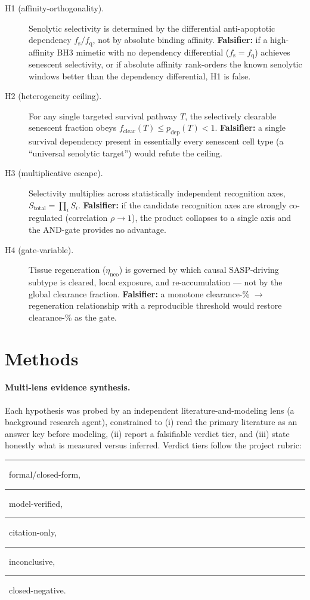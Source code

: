 \documentclass[11pt,a4paper]{article}
\newcommand{\tierdisc}[1]{\textcolor{#1}{\rule[0.05ex]{1.0ex}{1.0ex}}}
\newcommand{\tierBlue}{\tierdisc{blue!70!black}}
\newcommand{\tierGreen}{\tierdisc{green!60!black}}
\newcommand{\tierYellow}{\tierdisc{yellow!85!black}}
\newcommand{\tierOrange}{\tierdisc{orange!90!black}}
\newcommand{\tierRed}{\tierdisc{red!80!black}}
\newcommand{\fs}{f_{\mathrm{s}}}
\newcommand{\fq}{f_{\mathrm{q}}}
\newcommand{\Stot}{S_{\mathrm{total}}}
\newcommand{\fclear}{f_{\mathrm{clear}}}
\newcommand{\pdep}{p_{\mathrm{dep}}}
\begin{document}
\begin{description}
\item[H1 (affinity-orthogonality).] Senolytic selectivity is determined by the
  differential anti-apoptotic dependency $\fs/\fq$, not by absolute binding
  affinity. \textbf{Falsifier:} if a high-affinity BH3 mimetic with no
  dependency differential ($\fs=\fq$) achieves senescent selectivity, or if
  absolute affinity rank-orders the known senolytic windows better than the
  dependency differential, H1 is false.
\item[H2 (heterogeneity ceiling).] For any single targeted survival pathway
  $T$, the selectively clearable senescent fraction obeys
  $\fclear(T)\le\pdep(T)<1$. \textbf{Falsifier:} a single survival dependency
  present in essentially every senescent cell type (a ``universal senolytic
  target'') would refute the ceiling.
\item[H3 (multiplicative escape).] Selectivity multiplies across statistically
  independent recognition axes, $\Stot=\prod_i S_i$. \textbf{Falsifier:} if the
  candidate recognition axes are strongly co-regulated (correlation
  $\rho\to1$), the product collapses to a single axis and the AND-gate provides
  no advantage.
\item[H4 (gate-variable).] Tissue regeneration ($\eta_{\mathrm{neo}}$) is
  governed by which causal SASP-driving subtype is cleared, local exposure, and
  re-accumulation --- not by the global clearance fraction. \textbf{Falsifier:}
  a monotone clearance-\% $\to$ regeneration relationship with a reproducible
  threshold would restore clearance-\% as the gate.
\end{description}

\section{Methods}
\label{sec:methods}

\paragraph{Multi-lens evidence synthesis.}
Each hypothesis was probed by an independent literature-and-modeling lens
(a background research agent), constrained to (i) read the primary literature
as an answer key before modeling, (ii) report a falsifiable verdict tier, and
(iii) state honestly what is measured versus inferred. Verdict tiers follow the
project rubric: \tierBlue{}~formal/closed-form, \tierGreen{}~model-verified,
\tierYellow{}~citation-only, \tierOrange{}~inconclusive, \tierRed{}~closed-negative.
\end{document}

